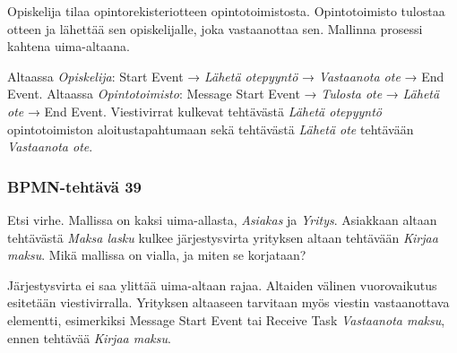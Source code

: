 \documentclass[
  finnish,
  letterpaper,
  DIV=11,
  numbers=noendperiod,
  oneside]{scrreprt}
\begin{document}
Opiskelija tilaa opintorekisteriotteen opintotoimistosta. Opintotoimisto
tulostaa otteen ja lähettää sen opiskelijalle, joka vastaanottaa sen.
Mallinna prosessi kahtena uima-altaana.

\begin{tcolorbox}[enhanced jigsaw, arc=.35mm, bottomrule=.15mm, bottomtitle=1mm, breakable, colback=white, colbacktitle=quarto-callout-tip-color!10!white, colframe=quarto-callout-tip-color-frame, coltitle=black, left=2mm, leftrule=.75mm, opacityback=0, opacitybacktitle=0.6, rightrule=.15mm, title=\textcolor{quarto-callout-tip-color}{\faLightbulb}\hspace{0.5em}{Malliratkaisu}, titlerule=0mm, toprule=.15mm, toptitle=1mm]

Altaassa \emph{Opiskelija}: Start Event → \emph{Lähetä otepyyntö} →
\emph{Vastaanota ote} → End Event. Altaassa \emph{Opintotoimisto}:
Message Start Event → \emph{Tulosta ote} → \emph{Lähetä ote} → End
Event. Viestivirrat kulkevat tehtävästä \emph{Lähetä otepyyntö}
opintotoimiston aloitustapahtumaan sekä tehtävästä \emph{Lähetä ote}
tehtävään \emph{Vastaanota ote}.

\end{tcolorbox}

\subsubsection{BPMN-tehtävä 39}\label{bpmn-tehtuxe4vuxe4-39}

Etsi virhe. Mallissa on kaksi uima-allasta, \emph{Asiakas} ja
\emph{Yritys}. Asiakkaan altaan tehtävästä \emph{Maksa lasku} kulkee
järjestysvirta yrityksen altaan tehtävään \emph{Kirjaa maksu}. Mikä
mallissa on vialla, ja miten se korjataan?

\begin{tcolorbox}[enhanced jigsaw, arc=.35mm, bottomrule=.15mm, bottomtitle=1mm, breakable, colback=white, colbacktitle=quarto-callout-tip-color!10!white, colframe=quarto-callout-tip-color-frame, coltitle=black, left=2mm, leftrule=.75mm, opacityback=0, opacitybacktitle=0.6, rightrule=.15mm, title=\textcolor{quarto-callout-tip-color}{\faLightbulb}\hspace{0.5em}{Malliratkaisu}, titlerule=0mm, toprule=.15mm, toptitle=1mm]

Järjestysvirta ei saa ylittää uima-altaan rajaa. Altaiden välinen
vuorovaikutus esitetään viestivirralla. Yrityksen altaaseen tarvitaan
myös viestin vastaanottava elementti, esimerkiksi Message Start Event
tai Receive Task \emph{Vastaanota maksu}, ennen tehtävää \emph{Kirjaa
maksu}.

\end{tcolorbox}
\end{document}
